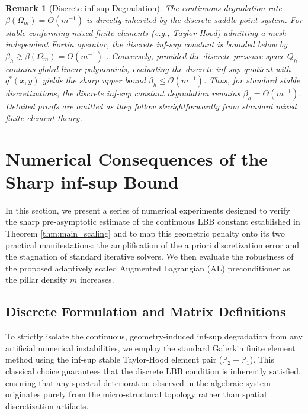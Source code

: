 \documentclass{elsarticle}
\newtheorem{remark}{Remark}
\begin{document}
\begin{remark}[Discrete inf-sup Degradation] \label{rmk:discrete_infsup}
    The continuous degradation rate $\beta(\Omega_m) = \Theta(m^{-1})$ is directly inherited by the discrete saddle-point system. For stable conforming mixed finite elements (e.g., Taylor-Hood) admitting a mesh-independent Fortin operator, the discrete inf-sup constant is bounded below by $\beta_h \gtrsim  \beta(\Omega_m) = \Theta(m^{-1})$ \cite{boffi2013mixed,Chen2014}. Conversely, provided the discrete pressure space $Q_h$ contains global linear polynomials, evaluating the discrete inf-sup quotient with $q^*(x,y)$ yields the sharp upper bound $\beta_h \le \mathcal{O}(m^{-1})$. Thus, for standard stable discretizations, the discrete inf-sup constant degradation remains $\beta_h = \Theta(m^{-1})$. Detailed proofs are omitted as they follow straightforwardly from standard mixed finite element theory.
\end{remark}

\section{Numerical Consequences of the Sharp inf-sup Bound}\label{sec:numerical}
In this section, we present a series of numerical experiments designed to verify the sharp pre-asymptotic estimate of the continuous LBB constant established in Theorem \ref{thm:main_scaling} and to map this geometric penalty onto its two practical manifestations: the amplification of the a priori discretization error and the stagnation of standard iterative solvers. We then evaluate the robustness of the proposed adaptively scaled Augmented Lagrangian (AL) preconditioner as the pillar density $m$ increases.

\subsection{Discrete Formulation and Matrix Definitions}

To strictly isolate the continuous, geometry-induced inf-sup degradation from any artificial numerical instabilities, we employ the standard Galerkin finite element method using the inf-sup stable Taylor-Hood element pair ($\mathbb{P}_2-\mathbb{P}_1$). This classical choice guarantees that the discrete LBB condition is inherently satisfied, ensuring that any spectral deterioration observed in the algebraic system originates purely from the micro-structural topology rather than spatial discretization artifacts.
\end{document}

